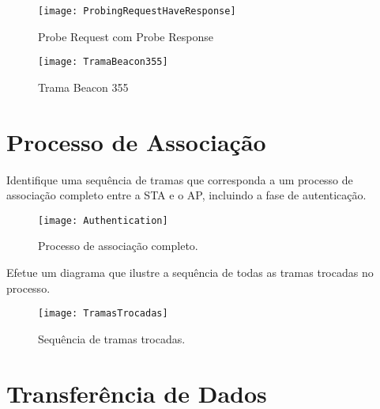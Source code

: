 \documentclass{exam}
\begin{document}
\begin{questions}
\begin{figure}[H]
\centering\texttt{[image: ProbingRequestHaveResponse]} 
\caption{\label{fig:controller}Probe Request com Probe Response}
\end{figure}



\begin{figure}[H]
\centering\texttt{[image: TramaBeacon355]} 
\caption{\label{fig:controller}Trama Beacon 355}
\end{figure}

\end{questions}


\section{Processo de Associação}
\begin{questions}
\question Identifique uma sequência de tramas que corresponda a um processo de associação completo entre a STA e o AP, incluindo a fase de autenticação.
\begin{figure}[H]
\centering\texttt{[image: Authentication]} 
\caption{\label{fig:controller}Processo de associação completo.}
\end{figure}


\question Efetue um diagrama que ilustre a sequência de todas as tramas trocadas no processo.
\begin{figure}[H]
\centering\texttt{[image: TramasTrocadas]} 
\caption{\label{fig:controller}Sequência de tramas trocadas.}
\end{figure}
\end{questions}

\section{Transferência de Dados}
\end{document}
